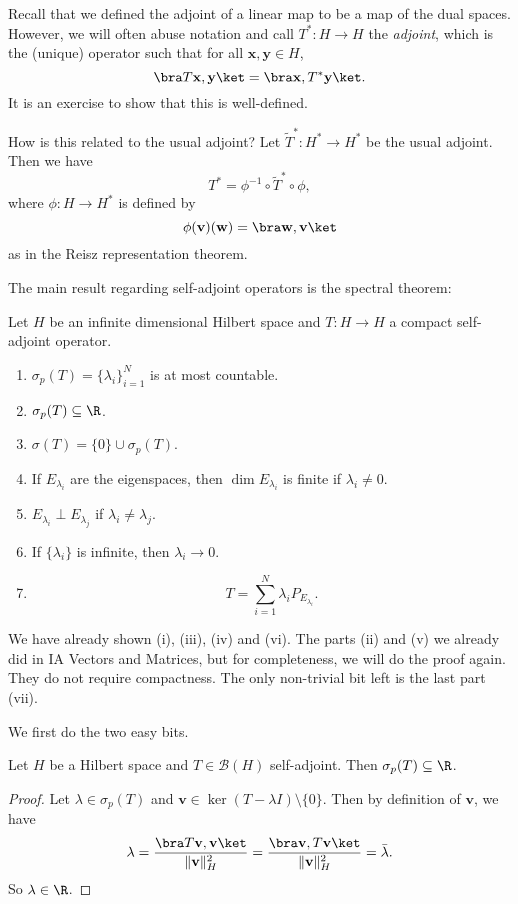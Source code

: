 \documentclass[a4paper]{article}
\begin{document}
Recall that we defined the adjoint of a linear map to be a map of the dual spaces. However, we will often abuse notation and call $T^*: H \to H$ the \emph{adjoint}, which is the (unique) operator such that for all $\mathbf{x}, \mathbf{y} \in H$,
\[
  \bra T \mathbf{x}, \mathbf{y}\ket = \bra \mathbf{x}, T^* \mathbf{y}\ket.
\]
It is an exercise to show that this is well-defined.

How is this related to the usual adjoint? Let $\tilde{T}^*: H^* \to H^*$ be the usual adjoint. Then we have
\[
  T^* = \phi^{-1} \circ \tilde{T}^* \circ \phi,
\]
where $\phi: H \to H^*$ is defined by
\[
  \phi(\mathbf{v})(\mathbf{w}) = \bra \mathbf{w}, \mathbf{v}\ket
\]
as in the Reisz representation theorem.

The main result regarding self-adjoint operators is the spectral theorem:
\begin{thm}
  Let $H$ be an infinite dimensional Hilbert space and $T: H \to H$ a compact self-adjoint operator.
  \begin{enumerate}
    \item $\sigma_p(T) = \{\lambda_i\}_{i = 1}^N$ is at most countable.
    \item $\sigma_p(T) \subseteq \R$.
    \item $\sigma(T) = \{0\} \cup \sigma_p(T)$.
    \item If $E_{\lambda_i}$ are the eigenspaces, then $\dim E_{\lambda_i}$ is finite if $\lambda_i \not= 0$.
    \item $E_{\lambda_i} \perp E_{\lambda_j}$ if $\lambda_i \not= \lambda_j$.
    \item If $\{\lambda_i\}$ is infinite, then $\lambda_i \to 0$.
    \item
      \[
        T = \sum_{i = 1}^N \lambda_i P_{E_{\lambda_i}}.
      \]
  \end{enumerate}
\end{thm}
We have already shown (i), (iii), (iv) and (vi). The parts (ii) and (v) we already did in IA Vectors and Matrices, but for completeness, we will do the proof again. They do not require compactness. The only non-trivial bit left is the last part (vii).

We first do the two easy bits.
\begin{prop}
  Let $H$ be a Hilbert space and $T \in \mathcal{B}(H)$ self-adjoint. Then $\sigma_p(T) \subseteq \R$.
\end{prop}

\begin{proof}
  Let $\lambda \in \sigma_p(T)$ and $\mathbf{v} \in \ker(T - \lambda I) \setminus \{0\}$. Then by definition of $\mathbf{v}$, we have
  \[
    \lambda = \frac{\bra T \mathbf{v}, \mathbf{v}\ket}{\|\mathbf{v}\|^2_H} = \frac{\bra \mathbf{v}, T \mathbf{v}\ket}{\|\mathbf{v}\|^2_H} = \bar{\lambda}.
  \]
  So $\lambda \in \R$.
\end{proof}
\end{document}
